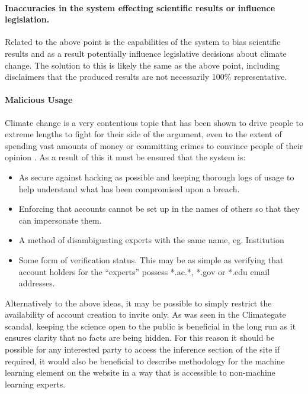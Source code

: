 \documentclass[11pt]{article} %
\numberwithin{equation}{section}
\begin{document}
\paragraph{Inaccuracies in the system effecting scientific results or influence
legislation. }

Related to the above point is the capabilities of the system to bias
scientific results and as a result potentially influence legislative
decisions about climate change. The solution to this is likely the
same as the above point, including disclaimers that the produced results
are not necessarily 100\% representative. 

\paragraph{Malicious Usage}

Climate change is a very contentious topic that has been shown to
drive people to extreme lengths to fight for their side of the argument,
even to the extent of spending vast amounts of money or committing
crimes to convince people of their opinion \cite{nerlich2010climategate}. As a result
of this it must be ensured that the system is:
\begin{itemize}
\item As secure against hacking as possible and keeping thorough logs of
usage to help understand what has been compromised upon a breach.
\item Enforcing that accounts cannot be set up in the names of others so
that they can impersonate them. 
\item A method of disambiguating experts with the same name, eg. Institution
\item Some form of verification status. This may be as simple as verifying
that account holders for the ``experts'' possess {*}.ac.{*}, {*}.gov
or {*}.edu email addresses. 
\end{itemize}
Alternatively to the above ideas, it may be possible to simply restrict
the availability of account creation to invite only. As was seen in
the Climategate scandal, keeping the science open to the public is
beneficial in the long run as it ensures clarity that no facts are
being hidden. For this reason it should be possible for any interested
party to access the inference section of the site if required, it
would also be beneficial to describe methodology for the machine learning
element on the website in a way that is accessible to non-machine
learning experts.
\end{document}
